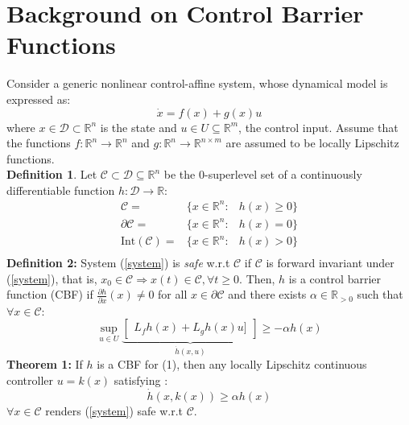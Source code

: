 \section*{Background on Control Barrier Functions}
Consider a generic nonlinear control-affine system, whose dynamical model is expressed as:
\begin{equation}
\dot{x}=f(x)+g(x)u
\label{system}
\end{equation}
where $x\in\mathcal{D}\subset \mathbb{R}^n$ is the state and $u\in U \subseteq \mathbb{R}^m$, the control input. Assume that the functions $f:\mathbb{R}^n\to\mathbb{R}^n$ and $g:\mathbb{R}^n\to\mathbb{R}^{n\times m} $ are assumed to be locally Lipschitz functions.\\
\textbf{Definition 1}. Let $\mathcal{C}\subset \mathcal{D}\subseteq \mathbb{R}^n$ be the $0$-superlevel set of a continuously  differentiable function $h:\mathcal{D}\to\mathbb{R}$:
\begin{equation}
\begin{aligned}
\mathcal{C} =& \{x\in\mathbb{R}^n :& h(x)\geq 0\} \\
\partial{\mathcal{C}} =& \{x\in\mathbb{R}^n :& h(x)= 0\} \\
\mathrm{Int}({\mathcal{C}}) =& \{x\in\mathbb{R}^n :& h(x)> 0\} \\
\end{aligned}
\end{equation}
\textbf{Definition 2:} System (\ref{system}) is \textit{safe} w.r.t $\mathcal{C}$ if $\mathcal{C}$ is forward invariant under (\ref{system}), that is, $x_0\in\mathcal{C}\Rightarrow x(t)\in\mathcal{C}, \forall t\geq0$.
Then, $h$ is a control barrier function (CBF) if $\frac{\partial{h}}{\partial x} (x)\neq 0$ for all $x\in \partial{\mathcal{C}}$ and there exists $\alpha \in \mathbb{R}_{>0}$ such that $\forall x \in \mathcal{C}$: 
\begin{equation}
\sup_{u\in U} \underbrace{ 
\begin{bmatrix}
L_fh(x) + L_gh(x)u] 
\end{bmatrix}}_{\dot{h}(x,u)}\geq -\alpha h(x)
\end{equation}
\textbf{Theorem 1:} If $h$ is a CBF for (1), then any locally Lipschitz continuous controller $u = k(x)$ satisfying : 
\begin{equation}
\dot{h}(x,k(x))\geq \alpha h(x)
\label{cond:2}
\end{equation}
$\forall{x}\in\mathcal{C}$ renders (\ref{system}) safe w.r.t $\mathcal{C}$. \\
